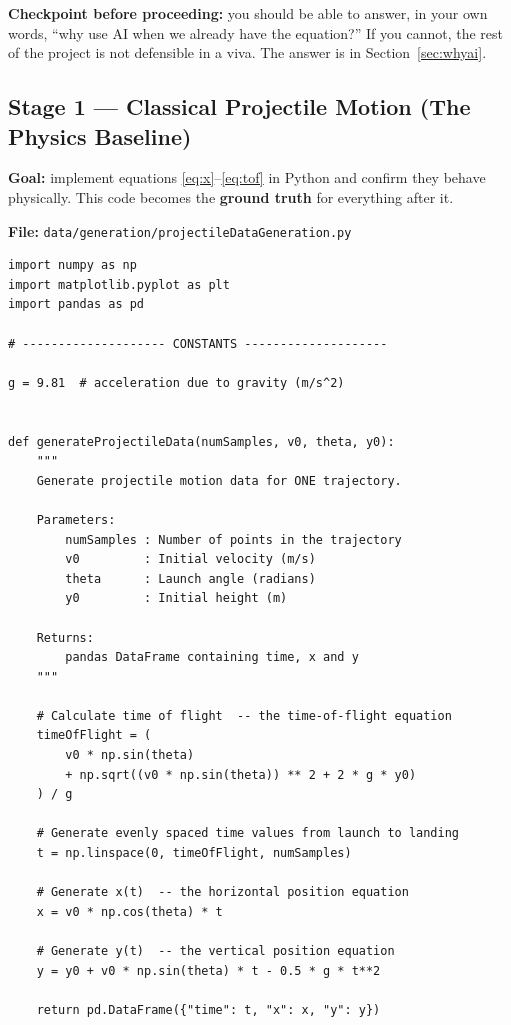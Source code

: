 \documentclass[11pt,a4paper]{article}
\begin{document}
\textbf{Checkpoint before proceeding:} you should be able to answer, in your own words, ``why use
AI when we already have the equation?'' If you cannot, the rest of the project is not defensible in
a viva. The answer is in Section~\ref{sec:whyai}.

\subsection*{Stage 1 --- Classical Projectile Motion (The Physics Baseline)}

\textbf{Goal:} implement equations \eqref{eq:x}--\eqref{eq:tof} in Python and confirm they behave
physically. This code becomes the \textbf{ground truth} for everything after it.

\textbf{File:} \texttt{data/generation/projectileDataGeneration.py}

\begin{lstlisting}[caption={Stage 1 --- the classical physics baseline.}]
import numpy as np
import matplotlib.pyplot as plt
import pandas as pd

# -------------------- CONSTANTS --------------------

g = 9.81  # acceleration due to gravity (m/s^2)


def generateProjectileData(numSamples, v0, theta, y0):
    """
    Generate projectile motion data for ONE trajectory.

    Parameters:
        numSamples : Number of points in the trajectory
        v0         : Initial velocity (m/s)
        theta      : Launch angle (radians)
        y0         : Initial height (m)

    Returns:
        pandas DataFrame containing time, x and y
    """

    # Calculate time of flight  -- the time-of-flight equation
    timeOfFlight = (
        v0 * np.sin(theta)
        + np.sqrt((v0 * np.sin(theta)) ** 2 + 2 * g * y0)
    ) / g

    # Generate evenly spaced time values from launch to landing
    t = np.linspace(0, timeOfFlight, numSamples)

    # Generate x(t)  -- the horizontal position equation
    x = v0 * np.cos(theta) * t

    # Generate y(t)  -- the vertical position equation
    y = y0 + v0 * np.sin(theta) * t - 0.5 * g * t**2

    return pd.DataFrame({"time": t, "x": x, "y": y})
\end{lstlisting}
\end{document}
